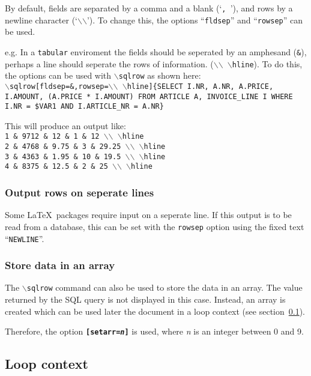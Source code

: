 \documentclass{article}
\newcommand{\bs}{\ensuremath{\backslash}}
\newcommand{\vs}{\vspace{3mm}}
\begin{document}
By default, fields are separated by a comma and a blank (`\texttt{,~}'), and rows by 
a newline character (`\texttt{\bs\bs}'). To change this, the options ``\texttt{fldsep}''
and ``\texttt{rowsep}'' can be used.

e.g. In a \texttt{tabular} enviroment the fields should be seperated by an amphesand (\texttt{\&}),
perhaps a line should seperate the rows of information. (\texttt{\bs\bs~\bs hline}).
To do this, the options can be used with \texttt{\bs sqlrow} as shown here: \\
\texttt{\bs sqlrow[fldsep=\&,rowsep=\bs\bs~\bs hline]\{SELECT I.NR, A.NR, 
A.PRICE, I.AMOUNT, (A.PRICE * I.AMOUNT) FROM ARTICLE A, INVOICE\_LINE I WHERE I.NR = \$VAR1 
AND I.ARTICLE\_NR = A.NR\}}

\vs

This will produce an output like: \\
\texttt{1 \& 9712 \& 12 \& 1 \& 12 \bs\bs~\bs hline \\
2 \& 4768 \& 9.75 \& 3 \& 29.25 \bs\bs~\bs hline \\
3 \& 4363 \& 1.95 \& 10 \& 19.5 \bs\bs~\bs hline \\
4 \& 8375 \& 12.5 \& 2 \& 25 \bs\bs~\bs hline}

\subsubsection{Output rows on seperate lines}

Some \LaTeX\ packages require input on a seperate line. If this output is to be
read from a database, this can be set with the \texttt{rowsep} option using the
fixed text ``\texttt{NEWLINE}''.

\subsubsection{Store data in an array}


The \texttt{\bs sqlrow} command can also be used to store the data in an array. The value returned by the SQL query is not displayed in this case. Instead, an array is created which can be used later the document in a loop context (see section~\ref{loops}).

Therefore, the option \texttt{\textbf{[setarr=\textit{n}]}} is used, where \textit{n} is an integer between
0 and 9.

\subsection{Loop context}\label{loops}
\end{document}
